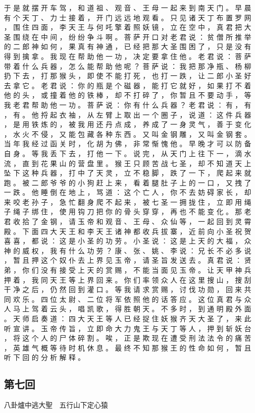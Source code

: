 {于 是 就 摆 开 车 驾 ， 和 道 祖 、 观 音 、 王 母 一 起 来 到 南 天 门 。
早 晨 有 个 天 丁 、 力 士 接 着 ， 开 门 远 远 地 观 看 。
只 见 诸 天 丁 布 置 罗 网 ， 围 住 四 面 ， 李 天 王 与 何 吒 擎 着 照 妖 镜 ， 立 在 空 中 ， 真 君 把 大 圣 围 绕 在 中 间 ， 纷 纷 争 斗 啊 。
菩 萨 开 口 对 老 君 说 ： 贫 僧 所 推 举 的 二 郎 神 如 何 ， 果 真 有 神 通 ， 已 经 把 那 大 圣 围 困 了 ， 只 是 没 有 得 到 擒 拿 。
我 现 在 帮 助 他 一 功 ， 决 定 要 拿 住 他 。
老 君 说 ： 菩 萨 带 着 什 么 兵 器 ， 怎 么 能 帮 助 他 呢 ？ 菩 萨 说 ： 我 把 那 净 瓶 、 杨 柳 扔 下 去 ， 打 那 猴 头 ， 即 使 不 能 打 死 ， 也 打 一 跌 ， 让 二 郎 小 圣 好 去 拿 它 。
老 君 说 ： 你 的 瓶 是 个 磁 器 ， 能 打 它 就 好 ， 如 果 打 不 着 他 的 头 ， 或 撞 着 他 的 铁 棒 ， 却 不 打 碎 了 ， 你 暂 且 不 要 动 手 ， 等 我 老 君 帮 助 他 一 功 。
菩 萨 说 ： 你 有 什 么 兵 器 ？ 老 君 说 ： 有 ， 有 ， 有 。
他 捋 起 衣 袖 ， 从 左 臂 上 取 出 一 个 圈 子 ， 说 道 ： 这 件 兵 器 ， 是 用 铁 炼 的 ， 被 我 用 还 丹 点 成 ， 养 成 了 一 身 灵 气 ， 善 于 变 化 ， 水 火 不 侵 ， 又 能 包 藏 各 种 东 西 。
又 叫 金 钢 雕 ， 又 叫 金 钢 套 。
当 年 我 经 过 函 关 时 ， 化 胡 为 佛 ， 非 常 惭 愧 他 。
早 晚 才 可 以 防 备 自 身 。
等 我 丢 下 去 ， 打 他 一 下 。
说 完 ， 从 天 门 上 往 下 一 ， 滴 水 流 ， 直 到 花 果 山 的 营 盘 里 。
猴 王 只 顾 苦 战 七 圣 ， 却 不 知 道 天 上 坠 下 这 种 兵 器 ， 打 中 了 天 灵 ， 立 不 稳 脚 ， 跌 了 一 下 ， 爬 起 来 就 跑 。
被 二 郎 爷 爷 的 小 狗 赶 上 来 ， 看 着 腿 肚 子 上 的 一 口 ， 又 拽 了 一 跌 。
他 睡 倒 在 地 上 ， 骂 道 ： 这 个 亡 人 ， 你 不 去 妨 碍 家 长 ， 却 来 咬 老 孙 子 ， 急 忙 翻 身 爬 不 起 来 ， 被 七 圣 一 拥 拢 住 ， 立 即 用 绳 子 绳 子 绑 住 ， 使 用 钩 刀 把 你 的 骨 头 穿 穿 ， 再 也 不 能 变 化 。
那 老 君 收 拾 了 金 钢 ， 请 玉 帝 和 观 音 、 王 母 、 众 仙 等 ， 一 起 回 到 灵 霄 殿 。
下 面 四 大 天 王 和 李 天 王 诸 神 都 收 兵 拔 寨 ， 近 前 向 小 圣 祝 贺 喜 喜 ， 都 说 ： 这 是 小 圣 的 功 劳 。
小 圣 说 ： 这 是 上 天 的 大 福 ， 众 神 的 威 权 ， 我 有 什 么 功 劳 ？ 康 、 张 、 姚 、 李 说 ： 兄 长 不 必 多 说 ， 暂 且 押 这 个 奴 仆 去 上 界 见 玉 帝 ， 请 圣 旨 发 送 去 。
真 君 说 ： 贤 弟 ， 你 们 没 有 接 受 上 天 的 赏 赐 ， 不 能 当 面 见 玉 帝 。
让 天 甲 神 兵 押 着 ， 我 同 天 王 等 上 界 回 来 。
你 们 率 领 众 人 在 这 里 搜 山 ， 搜 刮 干 净 之 后 ， 仍 然 回 到 灌 口 。
等 我 请 求 赏 赐 ， 讨 伐 功 勋 ， 回 来 共 同 欢 乐 。
四 位 太 尉 、 二 位 将 军 依 照 他 的 话 答 应 。
这 位 真 君 与 众 人 马 上 驾 着 云 头 ， 唱 凯 歌 ， 得 胜 朝 天 。
不 多 时 ， 到 通 明 殿 外 面 。
天 师 启 奏 道 ： 四 大 天 王 等 人 已 经 捉 住 妖 猴 齐 天 大 圣 了 ， 来 此 听 宣 讲 。
玉 帝 传 旨 ， 立 即 命 大 力 鬼 王 与 天 丁 等 人 ， 押 到 斩 妖 台 ， 将 这 个 人 的 尸 体 碎 割 。
唉 ， 正 是 欺 现 在 遭 受 刑 法 法 令 的 痛 苦 ， 英 雄 气 概 等 待 时 机 休 息 。
最 终 不 知 那 猴 王 的 性 命 如 何 ， 暂 且 听 下 回 的 分 析 解 释 。
}\switchcolumn\flushpage  \begin{pinyinscope}{\myfontt \section{第七回}     八卦爐中逃大聖　五行山下定心猿

}
\end{pinyinscope}
